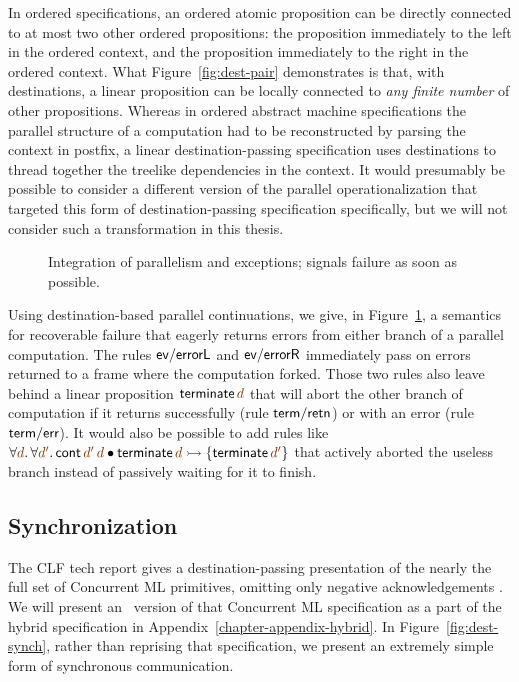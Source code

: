 In ordered specifications, an ordered atomic proposition can be
directly connected to at most two other ordered propositions: the
proposition immediately to the left in the ordered context, and the
proposition immediately to the right in the ordered context. What
Figure~\ref{fig:dest-pair} demonstrates is that, with destinations, a
linear proposition can be locally connected to {\it any finite number}
of other propositions. Whereas in ordered abstract machine
specifications the parallel structure of a computation had to be
reconstructed by parsing the context in postfix, a linear
destination-passing specification uses destinations to thread together
the treelike dependencies in the context. It would presumably be
possible to consider a different version of the parallel
operationalization that targeted this form of destination-passing
specification specifically, but we will not consider such a
transformation in this thesis. 

\begin{figure}
\caption{Integration of parallelism and exceptions; signals failure as
  soon as possible.}
\label{fig:dest-fail-paror}
\end{figure}

Using destination-based parallel continuations, we give, in
Figure~\ref{fig:dest-fail-paror}, a semantics for recoverable failure
that eagerly returns errors from either branch of a parallel
computation. The rules ${\sf ev/errorL}$ and ${\sf ev/errorR}$
immediately pass on errors returned to a frame where the computation
forked.  Those two rules also leave behind a linear proposition ${\sf
  terminate}\,\lf{d}$ that will abort the other branch of computation if it
returns successfully (rule ${\sf term/retn}$) or with an error (rule
${\sf term/err}$). It would also be possible to add rules
like $\forall \lf{d}.\,\forall\lf{d'}.\,{\sf cont}\,\lf{d'}\,\lf{d} \fuse {\sf terminate}\,\lf{d} \lefti \{ {\sf
  terminate}\,\lf{d'} \}$ that actively aborted the useless branch instead
of passively waiting for it to finish.

\subsection{Synchronization}
\label{sec:dest-synch}

The CLF tech report gives a destination-passing presentation of the
nearly the full set of Concurrent ML primitives, omitting only
negative acknowledgements \cite{cervesato02concurrent}. We will
present an \sls~version of that Concurrent ML specification as a part
of the hybrid specification in Appendix~\ref{chapter-appendix-hybrid}.
In Figure~\ref{fig:dest-synch}, rather than reprising that
specification, we present an extremely simple form of synchronous
communication.


